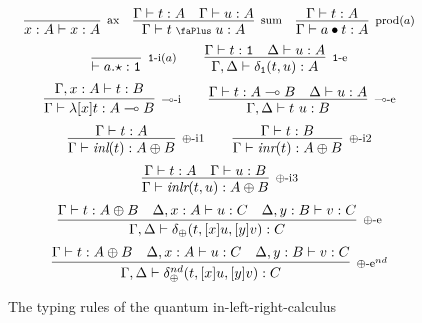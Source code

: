 \documentclass[screen, sigconf,authorversion,nonacm]{acmart}
\theoremstyle{acmdefinition}
\numberwithin{equation}{section}
\newcommand\irule[3]{\infer[\mbox{\footnotesize $#3$}]{#2}{#1}}
\newcommand\abstr[1]{[#1]}
\newcommand\inl{\mbox{\it inl}}
\newcommand\inr{\mbox{\it inr}}
\newcommand\inlr{\mbox{\it inlr}}
\newcommand\plus{\mathrel{\text{\normalfont\scalebox{0.7}{\faPlus}}}}
\newcommand\one{\ensuremath{\mathtt 1}}
\newcommand\elimone{\delta_{\one}}
\newcommand\elimplus{\delta_{\oplus}}
\begin{document}
\begin{figure}[t]
  $$\irule{}
  {x:A \vdash x:A}
  {\mbox{ax}}
  \quad
  \irule{\Gamma \vdash t:A & \Gamma \vdash u:A}
  {\Gamma \vdash t \plus u:A}
  {\mbox{sum}}
  \quad
  \irule{\Gamma \vdash t:A}
  {\Gamma \vdash a \bullet t:A}
  {\mbox{prod}(a)}
  $$
  $$
  \irule{}
  {\vdash a.\star:\one}
  {\mbox{$\one$-i}(a)}
  \qquad
  \irule{\Gamma \vdash t:\one & \Delta \vdash u:A}
  {\Gamma, \Delta \vdash \elimone(t,u):A}
  {\mbox{$\one$-e}}
  $$
  $$
  \irule{\Gamma, x:A \vdash t:B}
  {\Gamma \vdash \lambda \abstr{x}t:A \multimap B}
  {\mbox{$\multimap$-i}}
  \qquad
  \irule{\Gamma \vdash t:A\multimap B & \Delta \vdash u:A}
  {\Gamma, \Delta \vdash t~u:B}
  {\mbox{$\multimap$-e}}
  $$
  $$\irule{\Gamma \vdash t:A}
  {\Gamma \vdash \inl(t):A \oplus B}
  {\mbox{$\oplus$-i1}}
  \qquad
  \irule{\Gamma \vdash t:B}
  {\Gamma \vdash \inr(t):A \oplus B}
  {\mbox{$\oplus$-i2}}$$
  $$\irule{\Gamma \vdash t:A & \Gamma \vdash u:B}
  {\Gamma \vdash \inlr(t,u):A \oplus B}
  {\mbox{$\oplus$-i3}}$$
  $$\irule{\Gamma \vdash t:A \oplus B & \Delta, x:A \vdash u:C & \Delta, y:B \vdash v:C}
  {\Gamma, \Delta \vdash \elimplus(t,\abstr{x}u,\abstr{y}v):C}
  {\mbox{$\oplus$-e}}$$
$$\irule{\Gamma \vdash t:A \oplus B & \Delta, x:A \vdash u:C & \Delta,
  y:B \vdash v:C} {\Gamma, \Delta \vdash
  \elimplus^{nd}(t,\abstr{x}u,\abstr{y}v):C} {\mbox{$\oplus$-e$^{nd}$}}$$
  \caption{The typing rules of the quantum in-left-right-calculus\label{linear}}
\end{figure}
\end{document}
